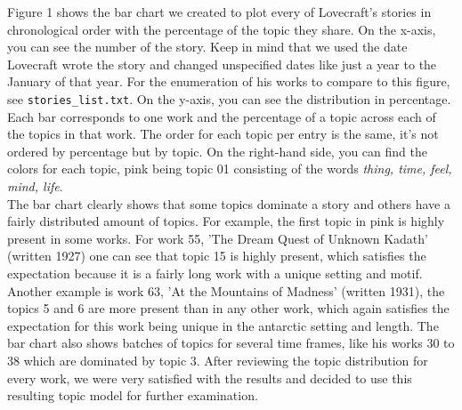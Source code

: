 Figure 1 shows the bar chart we created to plot every of Lovecraft's stories in chronological order 
with the percentage of the topic they share. On the x-axis, you can see the number of the story. 
Keep in mind that we used the date Lovecraft wrote the story and changed unspecified dates like just 
a year to the January of that year. For the enumeration of his works to compare to this figure, see 
\texttt{stories\_list.txt}. On the y-axis, you can see the distribution in percentage. Each bar corresponds to 
one work and the percentage of a topic across each of the topics in that work. The order for each 
topic per entry is the same, it's not ordered by percentage but by topic. On the right-hand side, you 
can find the colors for each topic, pink being topic 01 consisting of the words \textit{thing, time, feel, 
mind, life}.\\

The bar chart clearly shows that some topics dominate a story and others have a fairly distributed 
amount of topics. For example, the first topic in pink is highly present in some works. For 
work 55, 'The Dream Quest of Unknown Kadath' (written 1927) one can see that topic 15 is highly 
present, which satisfies the expectation because it is a fairly long work with a unique setting 
and motif. Another example is work 63, 'At the Mountains of Madness' (written 1931), the topics 
5 and 6 are more present than in any other work, which again satisfies the expectation for this 
work being unique in the antarctic setting and length. The bar chart also shows batches of topics 
for several time frames, like his works 30 to 38 which are dominated by topic 3. After reviewing 
the topic distribution for every work, we were very satisfied with the results and decided to use 
this resulting topic model for further examination.\\

